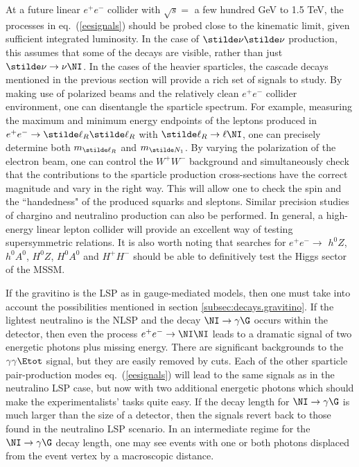 At a future linear $e^+e^-$ collider
with $\sqrt{s} = $ a few hundred GeV to
1.5 TeV, the processes in eq.~(\ref{eesignals}) should be
probed close to the kinematic limit, given sufficient integrated
luminosity.\cite{NLCsusy}
In the case of $\stilde \nu\stilde \nu$ production, this
assumes that some of the decays are visible, rather than just
$\stilde\nu\rightarrow\nu\NI$. In the cases of the heavier sparticles,
the cascade decays mentioned in the previous section will provide a rich
set of signals to study. By making use of polarized beams and the
relatively clean $e^+e^-$ collider environment, one can
disentangle the sparticle spectrum. For example, measuring the maximum
and minimum energy endpoints of the leptons produced in $e^+e^-
\rightarrow \stilde\ell_R\stilde\ell_R$ with
$\stilde\ell_R \rightarrow \ell\NI$,
one can precisely determine both $m_{\stilde\ell_R}$ and
$m_{\stilde N_1}$. By varying the polarization of the electron beam,
one can control the $W^+W^-$ background and simultaneously check
that the contributions to the sparticle production cross-sections have the
correct magnitude and vary in the right
way. This will allow one to check
the spin and the ``handedness" of the produced squarks and sleptons.
Similar precision studies of chargino and neutralino production
can also be performed. In general, a high-energy linear lepton collider
will provide an excellent way of testing supersymmetric relations.
It is also worth noting that searches for $e^+e^- \rightarrow$
$h^0Z$, $h^0A^0$, $H^0Z$, $H^0A^0$ and $H^+H^-$ should be able to
definitively test the Higgs sector of the MSSM.

If the gravitino is the LSP as in gauge-mediated models, then one must
take into account the possibilities mentioned in section
\ref{subsec:decays.gravitino}.
If the lightest neutralino is the NLSP and the decay
$\NI\rightarrow\gamma\G$ occurs within the detector, then even the
process $e^+e^-\rightarrow \NI\NI$ leads to a dramatic signal of
two energetic photons plus missing energy.\cite{eeGMSBsignal,DDRT,AKKMM2}
There are
significant
backgrounds to the $\gamma\gamma\Etot$ signal, but they are
easily removed by cuts. Each of the other sparticle pair-production
modes eq.~(\ref{eesignals}) will lead to the same signals
as in the neutralino LSP case, but now with two additional
energetic photons which should make the experimentalists' tasks
quite easy. If the decay length for $\NI\rightarrow\gamma\G$ is much
larger than the
size of a detector, then the signals revert back to those found in
the neutralino LSP scenario. In an intermediate regime for
the $\NI\rightarrow\gamma\G$
decay length, one may see events with one or both
photons displaced from the event vertex by a macroscopic distance.

